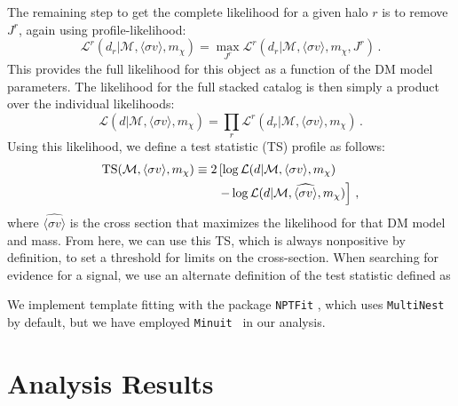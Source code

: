 The remaining step to get the complete likelihood for a given halo $r$ is to remove $J^r$, again using profile-likelihood:
\begin{equation}
\mathcal{L}^r(d_r | \mathcal{M}, \langle \sigma v \rangle, m_\chi) = \max_{J^r} \mathcal{L}^r(d_r | \mathcal{M}, \langle \sigma v \rangle, m_\chi, J^r)\,.
\end{equation}
This provides the full likelihood for this object as a function of the DM model parameters.  The likelihood for the full stacked catalog is then simply a product over the individual likelihoods:
\begin{equation}
\mathcal{L}(d | \mathcal{M}, \langle \sigma v \rangle, m_\chi) = \prod_r \mathcal{L}^r(d_r | \mathcal{M}, \langle \sigma v \rangle, m_\chi)\,.
\label{eq:likelihoodobjprod}
\end{equation}
Using this likelihood, we define a test statistic (TS) profile as follows:
\begin{equation}\begin{aligned}
{\rm TS}(\mathcal{M}, \langle\sigma v\rangle, m_\chi) \equiv 2 &\left[ \log \mathcal{L}(d | \mathcal{M}, \langle\sigma v\rangle, m_\chi ) \right.\\
&\left.- \log \mathcal{L}(d | \mathcal{M}, \widehat{\langle\sigma v\rangle}, m_\chi ) \right]\,,
\label{eq:TSdef}
\end{aligned}\end{equation}
where $\widehat{\langle\sigma v\rangle}$ is the cross section that maximizes the likelihood for that DM model and mass. From here, we can use this TS, which is always nonpositive by definition, to set a threshold for limits on the cross-section.  When searching for evidence for a signal, we use an alternate definition of the test statistic defined as 

We implement template fitting with the package \texttt{NPTFit} \cite{Mishra-Sharma:2016gis}, which uses \texttt{MultiNest}~\cite{Feroz:2008xx,Buchner:2014nha} by default, but we have employed \texttt{Minuit}~\cite{James:1975dr} in our analysis.

\section{Analysis Results}
\label{sec:smallrois}

